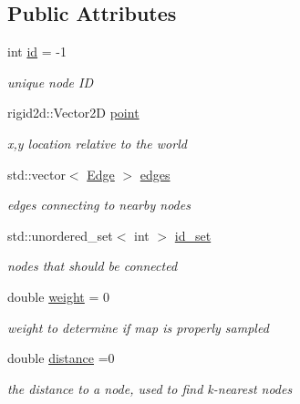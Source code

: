 \subsection*{Public Attributes}
\begin{DoxyCompactItemize}
\item 
\mbox{\label{structprm_1_1Node_a538d85b9f504bdb39268bd3168fd9211}} 
int \hyperlink{structprm_1_1Node_a538d85b9f504bdb39268bd3168fd9211}{id} = -\/1
\begin{DoxyCompactList}\small\item\em unique node ID \end{DoxyCompactList}\item 
\mbox{\label{structprm_1_1Node_afcf2b1941863d8d9a60874a30b9d2938}} 
rigid2d\+::\+Vector2D \hyperlink{structprm_1_1Node_afcf2b1941863d8d9a60874a30b9d2938}{point}
\begin{DoxyCompactList}\small\item\em x,y location relative to the world \end{DoxyCompactList}\item 
\mbox{\label{structprm_1_1Node_abf983b6e36e98f9caf0766b1e8c5500a}} 
std\+::vector$<$ \hyperlink{structprm_1_1Edge}{Edge} $>$ \hyperlink{structprm_1_1Node_abf983b6e36e98f9caf0766b1e8c5500a}{edges}
\begin{DoxyCompactList}\small\item\em edges connecting to nearby nodes \end{DoxyCompactList}\item 
\mbox{\label{structprm_1_1Node_a23d5570a4b85f7403399444e68d5aa52}} 
std\+::unordered\+\_\+set$<$ int $>$ \hyperlink{structprm_1_1Node_a23d5570a4b85f7403399444e68d5aa52}{id\+\_\+set}
\begin{DoxyCompactList}\small\item\em nodes that should be connected \end{DoxyCompactList}\item 
\mbox{\label{structprm_1_1Node_af137867e3fb1f9b0d3e43ef3fd8ddecd}} 
double \hyperlink{structprm_1_1Node_af137867e3fb1f9b0d3e43ef3fd8ddecd}{weight} = 0
\begin{DoxyCompactList}\small\item\em weight to determine if map is properly sampled \end{DoxyCompactList}\item 
\mbox{\label{structprm_1_1Node_a4db5966bcf026eaa4f2cd07ea22bcb4f}} 
double \hyperlink{structprm_1_1Node_a4db5966bcf026eaa4f2cd07ea22bcb4f}{distance} =0
\begin{DoxyCompactList}\small\item\em the distance to a node, used to find k-\/nearest nodes \end{DoxyCompactList}\end{DoxyCompactItemize}


